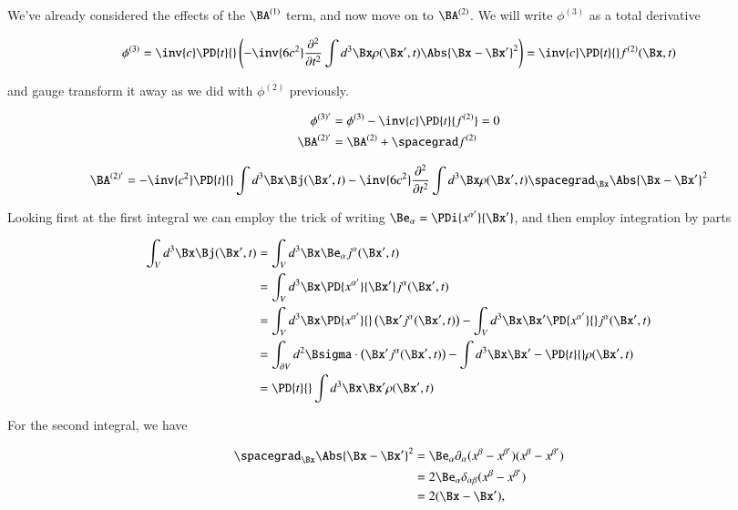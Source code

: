 We've already considered the effects of the $\BA^{(1)}$ term, and now move on to $\BA^{(2)}$.  We will write $\phi^{(3)}$ as a total derivative

\begin{equation}\label{eqn:relativisticElectrodynamicsL27:50}
\phi^{(3)} = \inv{c} \PD{t}{} \left( 
- \inv{6 c^2} 
\frac{\partial^2}{\partial t^2} \int d^3 \Bx \rho(\Bx', t)
\Abs{\Bx - \Bx'}^2
\right)
= \inv{c} \PD{t}{} f^{(2)}(\Bx, t)
\end{equation}

and gauge transform it away as we did with $\phi^{(2)}$ previously.

\begin{align}\label{eqn:relativisticElectrodynamicsL27:70}
\phi^{(3)'} &= \phi^{(3)} - \inv{c} \PD{t}{f^{(2)}} = 0 \\
\BA^{(2)'} &= \BA^{(2)} + \spacegrad f^{(2)} 
\end{align}

\begin{align*}
\BA^{(2)'} 
&= 
- 
\inv{c^2} \PD{t}{} \int d^3 \Bx \Bj(\Bx', t) 
- \inv{6 c^2} 
\frac{\partial^2}{\partial t^2} \int d^3 \Bx \rho(\Bx', t)
\spacegrad_{\Bx} \Abs{\Bx - \Bx'}^2 \\
\end{align*}

Looking first at the first integral we can employ the trick of writing $\Be_\alpha = \PDi{x^{\alpha'}}{\Bx'}$, and then employ integration by parts

\begin{align*}
\int_V d^3 \Bx \Bj(\Bx', t) 
&=
\int_V d^3 \Bx 
\Be_\alpha j^\alpha (\Bx', t)  \\
&=
\int_V d^3 \Bx 
\PD{x^{\alpha'}}{\Bx'}
j^\alpha (\Bx', t)  \\
&=
\int_V d^3 \Bx 
\PD{x^{\alpha'}}{} 
\left( \Bx' j^\alpha (\Bx', t) \right)
-\int_V d^3 \Bx
\Bx' \PD{x^{\alpha'}}{} j^\alpha (\Bx', t) \\
&=
\int_{\partial V} d^2 \Bsigma \cdot 
\left( \Bx' j^\alpha (\Bx', t) \right)
-\int d^3 \Bx 
\Bx' -\PD{t}{} \rho(\Bx', t) \\
&=
\PD{t}{} \int d^3 \Bx 
\Bx' \rho(\Bx', t) \\
\end{align*}

For the second integral, we have

\begin{align*}
\spacegrad_{\Bx} \Abs{\Bx - \Bx'}^2 
&= 
\Be_\alpha \partial_\alpha 
(x^\beta - x^{\beta'})
(x^\beta - x^{\beta'}) \\
&=
2 \Be_\alpha \delta_{\alpha \beta}
(x^\beta - x^{\beta'}) \\
&= 2 (\Bx - \Bx'),
\end{align*}


